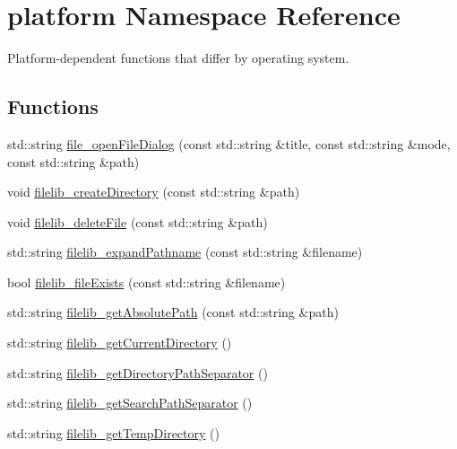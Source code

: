 \hypertarget{namespaceplatform}{}\section{platform Namespace Reference}
\label{namespaceplatform}


Platform-\/dependent functions that differ by operating system.  


\subsection*{Functions}
\begin{DoxyCompactItemize}
\item 
std\+::string \mbox{\hyperlink{namespaceplatform_aa812fb80e0cb15f75d35975ea91e8f2b}{file\+\_\+open\+File\+Dialog}} (const std\+::string \&title, const std\+::string \&mode, const std\+::string \&path)
\item 
void \mbox{\hyperlink{namespaceplatform_aa30655cd42c277a7c5ed7aba21cf0050}{filelib\+\_\+create\+Directory}} (const std\+::string \&path)
\item 
void \mbox{\hyperlink{namespaceplatform_a50db655854102498e7bbc1d5f409a29f}{filelib\+\_\+delete\+File}} (const std\+::string \&path)
\item 
std\+::string \mbox{\hyperlink{namespaceplatform_a7aec69b6d9120eefca74eeba8f7eb02d}{filelib\+\_\+expand\+Pathname}} (const std\+::string \&filename)
\item 
bool \mbox{\hyperlink{namespaceplatform_a7ac56ce70edb176e3d75d83732517d85}{filelib\+\_\+file\+Exists}} (const std\+::string \&filename)
\item 
std\+::string \mbox{\hyperlink{namespaceplatform_acbd0e6215f4690ad235ec00ee8fc82e2}{filelib\+\_\+get\+Absolute\+Path}} (const std\+::string \&path)
\item 
std\+::string \mbox{\hyperlink{namespaceplatform_a52fd33354355f61a96ea88ac33aaa11a}{filelib\+\_\+get\+Current\+Directory}} ()
\item 
std\+::string \mbox{\hyperlink{namespaceplatform_abf9418d14665b0404fd9a942cd890151}{filelib\+\_\+get\+Directory\+Path\+Separator}} ()
\item 
std\+::string \mbox{\hyperlink{namespaceplatform_a9641200cba6781202640c6b723341af2}{filelib\+\_\+get\+Search\+Path\+Separator}} ()
\item 
std\+::string \mbox{\hyperlink{namespaceplatform_a969c5e3fc13cd635656eba2845bc932e}{filelib\+\_\+get\+Temp\+Directory}} ()
\item 

\end{DoxyCompactItemize}
